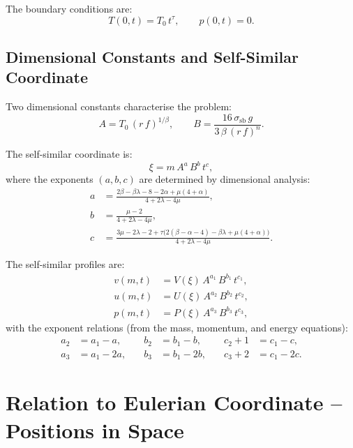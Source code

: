 \documentclass[11pt]{article}
\begin{document}
The boundary conditions are:
\begin{equation}
  T(0,t) = T_0\,t^{\tau}, \qquad p(0,t) = 0.
  \label{eq:bc}
\end{equation}

\subsection{Dimensional Constants and Self-Similar Coordinate}

Two dimensional constants characterise the problem:
\begin{equation}
  A = T_0\,(r\,f)^{1/\beta}, \qquad
  B = \frac{16\,\sigma_{\mathrm{sb}}\,g}
           {3\,\beta\,(r\,f)^{n}}.
\end{equation}

The self-similar coordinate is:
\begin{equation}
  \xi = m\,A^{a}\,B^{b}\,t^{c},
  \label{eq:xi_def}
\end{equation}
where the exponents $(a,b,c)$ are determined by dimensional analysis:
\begin{align}
  a &= \frac{2\beta - \beta\lambda - 8 - 2\alpha + \mu(4+\alpha)}
            {4 + 2\lambda - 4\mu}, \\[4pt]
  b &= \frac{\mu - 2}{4 + 2\lambda - 4\mu}, \\[4pt]
  c &= \frac{3\mu - 2\lambda - 2
             + \tau\bigl(2(\beta-\alpha-4) - \beta\lambda + \mu(4+\alpha)\bigr)}
            {4 + 2\lambda - 4\mu}.
\end{align}

The self-similar profiles are:
\begin{align}
  v(m,t) &= V(\xi)\,A^{a_1}\,B^{b_1}\,t^{c_1}, \\[2pt]
  u(m,t) &= U(\xi)\,A^{a_2}\,B^{b_2}\,t^{c_2}, \\[2pt]
  p(m,t) &= P(\xi)\,A^{a_3}\,B^{b_3}\,t^{c_3},
  \label{eq:ss_profiles}
\end{align}
with the exponent relations (from the mass, momentum, and energy equations):
\begin{align}
  a_2 &= a_1 - a, &\quad b_2 &= b_1 - b, &\quad c_2 + 1 &= c_1 - c, \label{eq:pow_rel_u}\\
  a_3 &= a_1 - 2a, &\quad b_3 &= b_1 - 2b, &\quad c_3 + 2 &= c_1 - 2c. \label{eq:pow_rel_p}
\end{align}

\section{Relation to Eulerian Coordinate -- Positions in Space}
\label{sec:eulerian}
\end{document}
